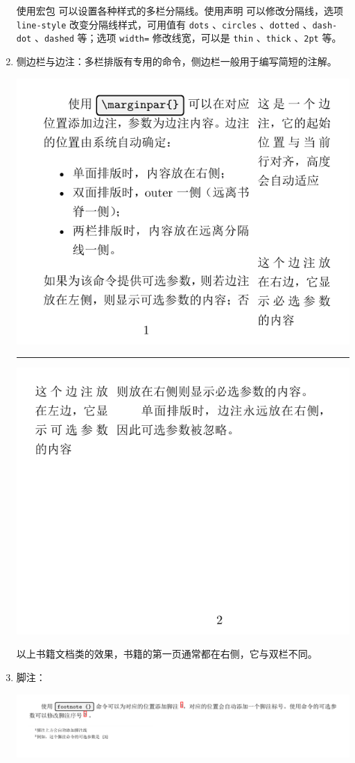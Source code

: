 \begin{enumerate}
使用宏包  可以设置各种样式的多栏分隔线。使用声明  可以修改分隔线，选项 \verb|line-style| 改变分隔线样式，可用值有 \verb|dots| 、\verb|circles| 、\verb|dotted| 、\verb|dash-dot| 、\verb|dashed| 等；选项 \verb|width=| 修改线宽，可以是 \verb|thin| 、\verb|thick| 、\verb|2pt| 等。

\item 侧边栏与边注：多栏排版有专用的命令，侧边栏一般用于编写简短的注解。

\hspace{-0.8cm}\includegraphics{./resource/tikz/margin-note-page1.pdf}\rule{0.3pt}{8cm}
\includegraphics{./resource/tikz/margin-note-page2.pdf}

以上书籍文档类的效果，书籍的第一页通常都在右侧，它与双栏不同。

\item 脚注：

\hspace{-1.6cm}\includegraphics{./resource/tikz/foot-note.pdf}



\end{enumerate}